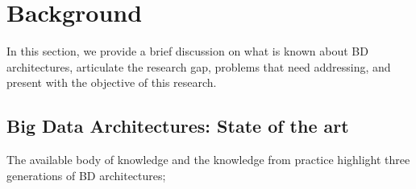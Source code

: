 \documentclass[review]{elsarticle}
\begin{document}
\section{Background} \label{background-section}

In this section, we provide a brief discussion on what is known about BD architectures, articulate the research gap, problems that need addressing, and present with the objective of this research. 

\subsection{Big Data Architectures: State of the art} \label{State of the art}

The available body of knowledge and the knowledge from practice highlight three generations of BD architectures;
\end{document}
